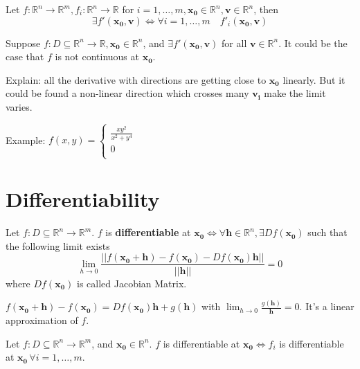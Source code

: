 \begin{proposition}
    Let $f: \mathbb{R}^{n} \to \mathbb{R}^{m}, f_i: \mathbb{R}^{n} \to \mathbb{R}$ for $i=1,\dots,m, \mathbf{x_0} \in \mathbb{R}^{n}, \mathbf{v} \in \mathbb{R}^{n}$, then \[
        \exists f'(\mathbf{x_0}, \mathbf{v}) \iff \forall i = 1,\dots,m \quad f'_i(\mathbf{x_0},\mathbf{v})
    \]
\end{proposition}

\begin{remark*}
    Suppose $f: D \subseteq \mathbb{R}^{n} \to \mathbb{R}, \mathbf{x_0} \in \mathbb{R}^{n}$, and $\exists f'(\mathbf{x_0},\mathbf{v})$ for all $\mathbf{v} \in \mathbb{R}^{n}$. It could be the case that $f$ is not continuous at $\mathbf{x_0}$.

    Explain: all the derivative with directions are getting close to $\mathbf{x_0}$ linearly. But it could be found a non-linear direction which crosses many $\mathbf{v_i}$ make the limit varies.

    Example:
    $f(x,y) = \left\{\begin{array}{l}
            \frac{xy ^{2}}{x ^{2} + y ^{4}} \\
            0                               \\
        \end{array}\right.$
\end{remark*}


\section{Differentiability}

\begin{definition}
    Let $f: D \subseteq \mathbb{R}^{n} \to \mathbb{R}^{m}$. $f$ is \textbf{differentiable} at $\mathbf{x_0} \iff \forall \mathbf{h} \in \mathbb{R}^{n}, \exists Df(\mathbf{x_0})$ such that the following limit exists \[
        \lim_{h \to 0} \frac{||f(\mathbf{x_0}+\mathbf{h})-f(\mathbf{x_0})-Df(\mathbf{x_0})\mathbf{h}||}{||\mathbf{h}||} = 0
    \]
    where $Df(\mathbf{x_0})$ is called Jacobian Matrix.
    \begin{remark*}
        $f(\mathbf{x_0}+\mathbf{h})-f(\mathbf{x_0}) = Df(\mathbf{x_0})\mathbf{h}+g(\mathbf{h})$ with $\lim_{h \to 0} \frac{g(\mathbf{h})}{\mathbf{h}} = 0$. It's a linear approximation of $f.$
    \end{remark*}
\end{definition}

\begin{proposition}
    Let $f: D \subseteq \mathbb{R}^{n} \to \mathbb{R}^{m}$, and $\mathbf{x_0} \in \mathbb{R}^{n}$.
    $f$ is differentiable at $\mathbf{x_0} \iff f_i$ is differentiable at $\mathbf{x_0}\, \forall i = 1,\dots,m$.
\end{proposition}

